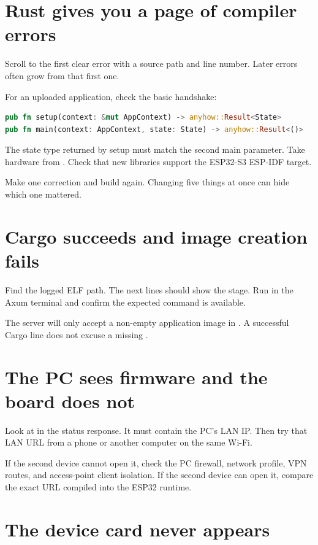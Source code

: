 \section{Rust gives you a page of compiler errors}

Scroll to the first clear error with a source path and line number. Later errors often grow from that first one.

For an uploaded application, check the basic handshake:

\begin{lstlisting}[language=Rust,numbers=none]
pub fn setup(context: &mut AppContext) -> anyhow::Result<State>
pub fn main(context: AppContext, state: State) -> anyhow::Result<()>
\end{lstlisting}

The state type returned by setup must match the second main parameter. Take hardware from . Check that new libraries support the ESP32-S3 ESP-IDF target.

Make one correction and build again. Changing five things at once can hide which one mattered.

\section{Cargo succeeds and image creation fails}

Find the logged ELF path. The next lines should show the  stage. Run  in the Axum terminal and confirm the expected command is available.

The server will only accept a non-empty application image in . A successful Cargo line does not excuse a missing .

\section{The PC sees firmware and the board does not}

Look at  in the status response. It must contain the PC's LAN IP. Then try that LAN URL from a phone or another computer on the same Wi-Fi.

If the second device cannot open it, check the PC firewall, network profile, VPN routes, and access-point client isolation. If the second device can open it, compare the exact URL compiled into the ESP32 runtime.

\section{The device card never appears}

